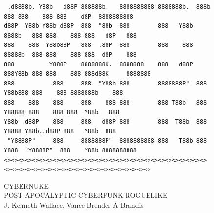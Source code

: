 \documentclass[10pt,conference,onecolumn,compsoc]{IEEEtran}
\begin{document}
\begin{figure}

\centering
\begin{footnotesize}
\begin{BVerbatim}
 .d8888b. Y88b   d88P 888888b.   8888888888 8888888b.  888b    888 888    888 888    d8P  8888888888 
d88P  Y88b Y88b d88P  888  "88b  888        888   Y88b 8888b   888 888    888 888   d8P   888        
888    888  Y88o88P   888  .88P  888        888    888 88888b  888 888    888 888  d8P    888        
888          Y888P    8888888K.  8888888    888   d88P 888Y88b 888 888    888 888d88K     8888888    
888           888     888  "Y88b 888        8888888P"  888 Y88b888 888    888 8888888b    888        
888    888    888     888    888 888        888 T88b   888  Y88888 888    888 888  Y88b   888        
Y88b  d88P    888     888   d88P 888        888  T88b  888   Y8888 Y88b..d88P 888   Y88b  888        
 "Y8888P"     888     8888888P"  8888888888 888   T88b 888    Y888  "Y8888P"  888    Y88b 8888888888 
<><><><><><><><><><><><><><><><><><><><><><><><><><><><><><><><><><><><><><><><><><><><><><><><><><>

\end{BVerbatim}
\end{footnotesize}

CYBERNUKE\\
{\small POST-APOCALYPTIC CYBERPUNK ROGUELIKE}\\
J. Kenneth Wallace, Vance Brender-A-Brandis\\
\end{figure}


\end{document}
